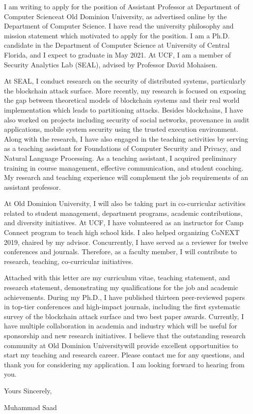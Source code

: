 \documentclass[10pt,stdletter]{newlfm}
\newcommand{\univ}{Old Dominion University}
\newcommand{\depart}{Department of Computer Science}
\begin{document}
\begin{newlfm}

I am writing to apply for the position of Assistant Professor at \depart at \univ, as advertised online by the \depart. I have read the university philosophy and mission statement which motivated to apply for the position. I am a Ph.D. candidate in the Department of Computer Science at University of Central Florida, and I expect to graduate in May 2021. At UCF, I am a member of Security Analytics Lab (SEAL), advised by Professor David Mohaisen. 

At SEAL, I conduct research on the security of distributed systems, particularly the blockchain attack surface. More recently, my research is focused on exposing the gap between theoretical models of blockchain systems and their real world implementation which leads to partitioning attacks. Besides blockchains, I have also worked on projects including security of social networks, provenance in audit applications, mobile system security using the trusted execution environment. Along with the research, I have also engaged in the teaching activities by serving as a teaching assistant for Foundations of Computer Security and Privacy, and Natural Language Processing. As a teaching assistant, I acquired preliminary training in course management, effective communication, and student coaching. My research and teaching experience will complement the job requirements of an assistant professor. 

At \univ, I will also be taking part in co-curricular activities related to student management, department programs, academic contributions, and diversity initiatives. At UCF, I have volunteered as an instructor for Camp Connect program to teach high school kids. I also helped organizing CoNEXT 2019, chaired by my advisor. Concurrently, I have served as a reviewer for twelve conferences and journals. Therefore, as a faculty member, I will contribute to research, teaching, co-curricular initiatives. 




Attached with this letter are my curriculum vitae, teaching statement, and research statement, demonstrating my qualifications for the job and academic achievements. During my Ph.D., I have published thirteen peer-reviewed papers in top-tier conferences and high-impact journals, including the first systematic survey of the blockchain attack surface and two best paper awards. Currently, I have multiple collaboration in academia and industry which will be useful for sponsorship and new research initiatives. I believe that the outstanding research community at \univ will provide excellent opportunities to start my teaching and research career. Please contact me for any questions, and thank you for considering my application. I am looking forward to hearing from you.

\vspace{5mm}
\hspace{120mm}
Yours Sincerely,


\hspace{120mm}
Muhammad Saad
\end{newlfm}
\end{document}

